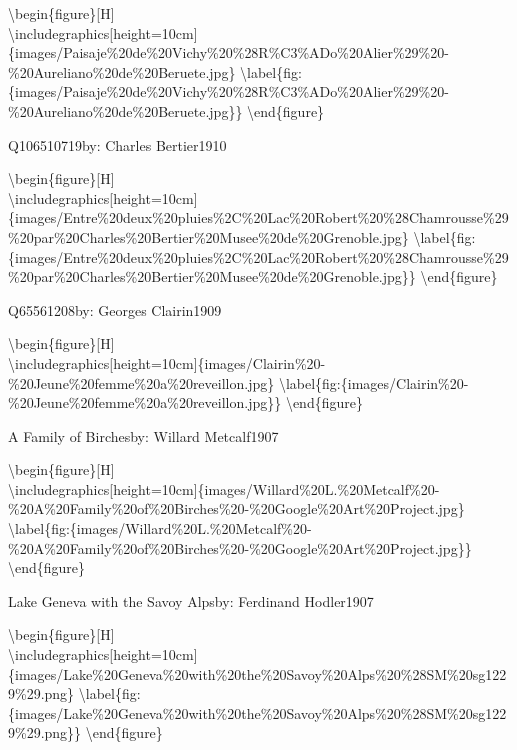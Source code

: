\documentclass[
  a4paper,
]{book}
\begin{document}
\textbackslash begin\{figure\}{[}H{]}\\
\textbackslash includegraphics{[}height=10cm{]}\{images/Paisaje\%20de\%20Vichy\%20\%28R\%C3\%ADo\%20Alier\%29\%20-\%20Aureliano\%20de\%20Beruete.jpg\}
\textbackslash label\{fig:\{images/Paisaje\%20de\%20Vichy\%20\%28R\%C3\%ADo\%20Alier\%29\%20-\%20Aureliano\%20de\%20Beruete.jpg\}\}
\textbackslash end\{figure\}

\label{http:ux2fux2fwww.wikidata.orgux2fentityux2fQ106510719}
Q106510719by: Charles Bertier1910

\textbackslash begin\{figure\}{[}H{]}\\
\textbackslash includegraphics{[}height=10cm{]}\{images/Entre\%20deux\%20pluies\%2C\%20Lac\%20Robert\%20\%28Chamrousse\%29\%20par\%20Charles\%20Bertier\%20Musee\%20de\%20Grenoble.jpg\}
\textbackslash label\{fig:\{images/Entre\%20deux\%20pluies\%2C\%20Lac\%20Robert\%20\%28Chamrousse\%29\%20par\%20Charles\%20Bertier\%20Musee\%20de\%20Grenoble.jpg\}\}
\textbackslash end\{figure\}

\label{http:ux2fux2fwww.wikidata.orgux2fentityux2fQ65561208}
Q65561208by: Georges Clairin1909

\textbackslash begin\{figure\}{[}H{]}\\
\textbackslash includegraphics{[}height=10cm{]}\{images/Clairin\%20-\%20Jeune\%20femme\%20a\%20reveillon.jpg\}
\textbackslash label\{fig:\{images/Clairin\%20-\%20Jeune\%20femme\%20a\%20reveillon.jpg\}\}
\textbackslash end\{figure\}

\label{http:ux2fux2fwww.wikidata.orgux2fentityux2fQ20491800}
A Family of Birchesby: Willard Metcalf1907

\textbackslash begin\{figure\}{[}H{]}\\
\textbackslash includegraphics{[}height=10cm{]}\{images/Willard\%20L.\%20Metcalf\%20-\%20A\%20Family\%20of\%20Birches\%20-\%20Google\%20Art\%20Project.jpg\}
\textbackslash label\{fig:\{images/Willard\%20L.\%20Metcalf\%20-\%20A\%20Family\%20of\%20Birches\%20-\%20Google\%20Art\%20Project.jpg\}\}
\textbackslash end\{figure\}

\label{http:ux2fux2fwww.wikidata.orgux2fentityux2fQ64787177}
Lake Geneva with the Savoy Alpsby: Ferdinand Hodler1907

\textbackslash begin\{figure\}{[}H{]}\\
\textbackslash includegraphics{[}height=10cm{]}\{images/Lake\%20Geneva\%20with\%20the\%20Savoy\%20Alps\%20\%28SM\%20sg1229\%29.png\}
\textbackslash label\{fig:\{images/Lake\%20Geneva\%20with\%20the\%20Savoy\%20Alps\%20\%28SM\%20sg1229\%29.png\}\}
\textbackslash end\{figure\}
\end{document}
